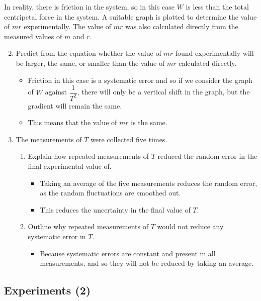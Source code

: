 \documentclass[a4paper,12pt]{article}
\let\oldsubsection\subsection
\renewcommand\subsection{\clearpage\oldsubsection}
\begin{document}
In reality, there is friction in the system, so in this case \( W \) is less than the total centripetal force in
the system. A suitable graph is plotted to determine the value of $mr$ experimentally. The value of
$mr$ was also calculated directly from the measured values of $m$ and $r$.

\begin{enumerate}[label=(\alph*)]
  \setcounter{enumi}{1}
  \item Predict from the equation whether the value of $mr$ found experimentally will be larger, the same, or smaller than the value of $mr$ calculated directly.
        \begin{itemize}
          \item Friction in this case is a systematic error and so if we consider the graph of $W$ against $\dfrac{1}{T^2}$, there will only be a vertical shift in the graph, but the gradient will remain the same.
          \item This means that the value of $mr$ is the same.
        \end{itemize}
  \item
        The measurements of $T$ were collected five times.
        \begin{enumerate}[label=(\roman*)]
          \item Explain how repeated measurements of $T$ reduced the random error in the final experimental value of.
                \begin{itemize}
                  \item Taking an average of the five measurements reduces the random error, as the random fluctuations are smoothed out.
                  \item This reduces the uncertainty in the final value of $T$.
                \end{itemize}
          \item Outline why repeated measurements of $T$ would not reduce any systematic error in $T$.
                \begin{itemize}
                  \item Because systematic errors are constant and present in all measurements, and so they will not be reduced by taking an average.
                \end{itemize}
        \end{enumerate}
\end{enumerate}

\subsection{Experiments (2)}
\end{document}
